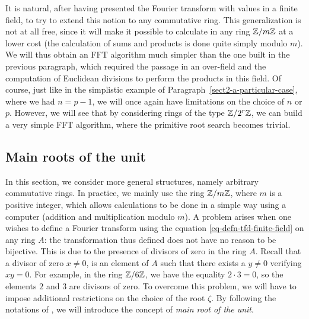  It is natural, after having presented the Fourier transform with values in a finite field, to try to extend this notion to any commutative ring. This generalization is not at all free, since it will make it possible to calculate in any ring $ \mathbb{Z}/m \mathbb{Z} $ at a lower cost (the calculation of sums and products is done quite simply modulo $ m $). We will thus obtain an FFT algorithm much simpler than the one built in the previous paragraph, which required the passage in an over-field and the computation of Euclidean divisions to perform the products in this field. Of course, just like in the simplistic example of Paragraph~\ref{sect2-a-particular-case}, where we had $ n = p-1 $, we will once again have limitations on the choice of $ n $ or $ p $. However, we will see that by considering rings of the type $ \mathbb{Z}/2^r \mathbb{Z} $, we can build a very simple FFT algorithm, where the primitive root search becomes trivial.
\subsection{Main roots of the unit}
\label{sect2-main-roots}
 
In this section, we consider more general structures, namely arbitrary commutative rings. In practice, we mainly use the ring $ \mathbb{Z}/m \mathbb{Z} $, where $ m $ is a positive integer, which allows calculations to be done in a simple way using a computer (addition and multiplication modulo $ m $). A problem arises when one wishes to define a Fourier transform using the equation \eqref{eq-defn-tfd-finite-field} on any ring $ A $: the transformation thus defined does not have no reason to be bijective. This is due to the presence of divisors of zero in the ring $ A $. Recall that a divisor of zero $ x \neq 0 $, is an element of $ A $ such that there exists a $ y \neq 0 $ verifying $ xy = 0 $. For example, in the ring $ \mathbb{Z}/6 \mathbb{Z} $, we have the equality $ 2 \cdot 3 = 0 $, so the elements $ 2 $ and $ 3 $ are divisors of zero. To overcome this problem, we will have to impose additional restrictions on the choice of the root  $ \zeta $. By following the notations of  \cite{demazure}, we will introduce the concept of \textit{main root of the unit}.
 
